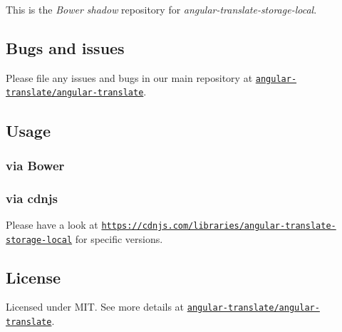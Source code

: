 This is the {\itshape Bower shadow} repository for {\itshape angular-\/translate-\/storage-\/local}.

\subsection*{Bugs and issues}

Please file any issues and bugs in our main repository at \href{https://github.com/angular-translate/angular-translate/issues}{\tt angular-\/translate/angular-\/translate}.

\subsection*{Usage}

\subsubsection*{via Bower}




\subsubsection*{via cdnjs}

Please have a look at \href{https://cdnjs.com/libraries/angular-translate-storage-local}{\tt https\+://cdnjs.\+com/libraries/angular-\/translate-\/storage-\/local} for specific versions.

\subsection*{License}

Licensed under M\+IT. See more details at \href{https://github.com/angular-translate/angular-translate}{\tt angular-\/translate/angular-\/translate}. 